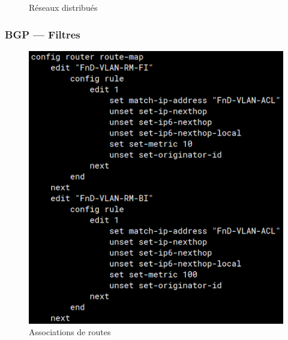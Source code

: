 \documentclass[french, a4paper]{beamer}
\begin{document}
\begin{frame}
\begin{minipage}{0.3\textwidth}
\begin{figure}[h!]
            \caption{Réseaux distribués}%
            \label{fig:fgt-auxr/bgp-nets}
        \end{figure}
    \end{minipage}
\end{frame}

\begin{frame}
    \frametitle{BGP --- Filtres}
    \begin{minipage}{0.55\textwidth}
        \begin{figure}[h!]
            \centering
            \includegraphics[width = \linewidth]{img/fgt-auxr/route-maps.png}
            \caption{Associations de routes}%
            \label{fig:fgt-auxr/route-maps}
        \end{figure}
    \end{minipage}%
    \hfill
    \begin{minipage}{0.4\textwidth}
        \begin{figure}[h!]
            \centering

\end{figure}
\end{minipage}
\end{frame}
\end{document}
